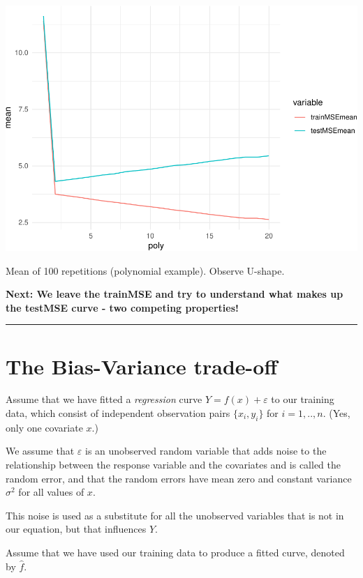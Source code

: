 \documentclass[]{article}
\begin{document}
\includegraphics{2StatLearn_files/figure-latex/unnamed-chunk-3-1.pdf}

Mean of 100 repetitions (polynomial example). Observe U-shape.

\textbf{Next: We leave the trainMSE and try to understand what makes up
the testMSE curve - two competing properties!}

\begin{center}\rule{0.5\linewidth}{\linethickness}\end{center}

\hypertarget{the-bias-variance-trade-off}{%
\section{The Bias-Variance
trade-off}\label{the-bias-variance-trade-off}}

Assume that we have fitted a \emph{regression} curve
\(Y = f(x) + \varepsilon\) to our training data, which consist of
independent observation pairs \(\{x_i, y_i\}\) for \(i=1,..,n\). (Yes,
only one covariate \(x\).)

We assume that \(\varepsilon\) is an unobserved random variable that
adds noise to the relationship between the response variable and the
covariates and is called the random error, and that the random errors
have mean zero and constant variance \(\sigma^2\) for all values of
\(x\).

This noise is used as a substitute for all the unobserved variables that
is not in our equation, but that influences \(Y\).

Assume that we have used our training data to produce a fitted curve,
denoted by \(\hat{f}\).
\end{document}

